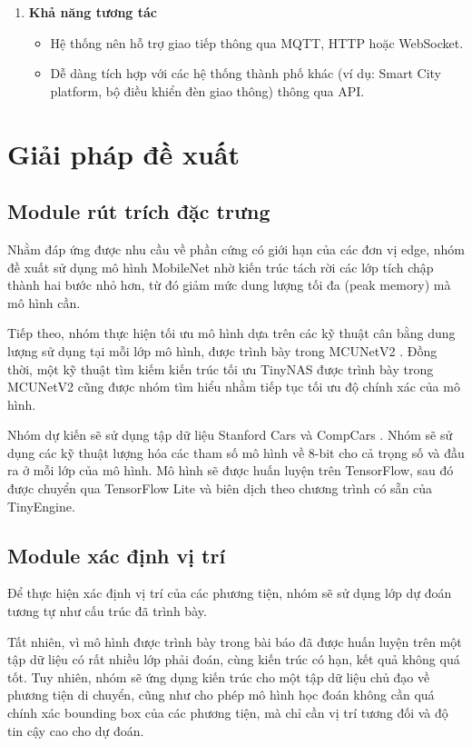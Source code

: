 \begin{enumerate}
    \item \textbf{Khả năng tương tác}
    \begin{itemize}
        \item Hệ thống nên hỗ trợ giao tiếp thông qua MQTT, HTTP hoặc WebSocket.
        \item Dễ dàng tích hợp với các hệ thống thành phố khác (ví dụ: Smart City platform, bộ điều khiển đèn giao thông) thông qua API.
    \end{itemize}
\end{enumerate}

\section{Giải pháp đề xuất}
\subsection{Module rút trích đặc trưng}
\quad Nhằm đáp ứng được nhu cầu về phần cứng có giới hạn của các đơn vị edge, nhóm đề xuất sử dụng mô hình MobileNet \cite{MobileNets2017} nhờ kiến trúc tách rời các lớp tích chập thành hai bước nhỏ hơn, từ đó giảm mức dung lượng tối đa (peak memory) mà mô hình cần. 

\quad Tiếp theo, nhóm thực hiện tối ưu mô hình dựa trên các kỹ thuật cân bằng dung lượng sử dụng tại mỗi lớp mô hình, được trình bày trong MCUNetV2 \cite{MCUNetV2_2021}. Đồng thời, một kỹ thuật tìm kiếm kiến trúc tối ưu TinyNAS \cite{MCUNetV2_2021} được trình bày trong MCUNetV2 cũng được nhóm tìm hiểu nhằm tiếp tục tối ưu độ chính xác của mô hình.

\quad Nhóm dự kiến sẽ sử dụng tập dữ liệu Stanford Cars  và CompCars \cite{CarDataset2015}. Nhóm sẽ sử dụng các kỹ thuật lượng hóa các tham số mô hình về 8-bit \cite{Quantization2018} cho cả trọng số và đầu ra ở mỗi lớp của mô hình. Mô hình sẽ được huấn luyện trên TensorFlow, sau đó được chuyển qua TensorFlow Lite và biên dịch theo chương trình có sẵn của TinyEngine.

\subsection{Module xác định vị trí}

\quad Để thực hiện xác định vị trí của các phương tiện, nhóm sẽ sử dụng lớp dự đoán tương tự như cấu trúc đã trình bày.

\quad Tất nhiên, vì mô hình được trình bày trong bài báo đã được huấn luyện trên một tập dữ liệu có rất nhiều lớp phải đoán, cùng kiến trúc có hạn, kết quả không quá tốt. Tuy nhiên, nhóm sẽ ứng dụng kiến trúc cho một tập dữ liệu chủ đạo về phương tiện di chuyển, cũng như cho phép mô hình học đoán không cần quá chính xác bounding box của các phương tiện, mà chỉ cần vị trí tương đối và độ tin cậy cao cho dự đoán.

